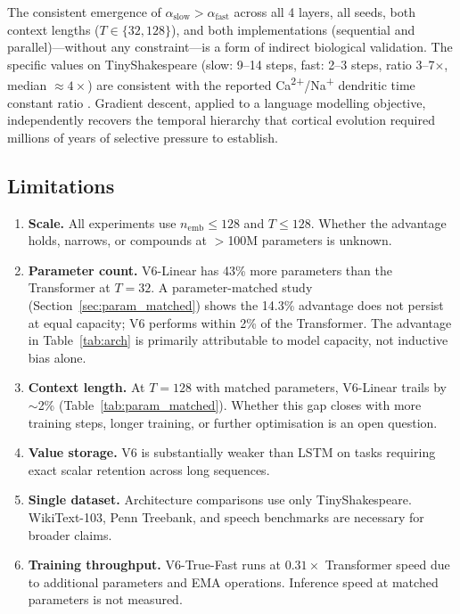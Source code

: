 \documentclass[11pt,a4paper]{article}
\begin{document}
The consistent emergence of $\alpha_\mathrm{slow} > \alpha_\mathrm{fast}$
across all 4 layers, all seeds, both context lengths ($T\in\{32,128\}$),
and both implementations (sequential and parallel)---without any
constraint---is a form of indirect biological validation.
The specific values on TinyShakespeare (slow: 9--14 steps,
fast: 2--3 steps, ratio 3--7$\times$, median $\approx4\times$)
are consistent with the reported
Ca\textsuperscript{2+}/Na\textsuperscript{+} dendritic time constant ratio
\citep{losonczy2006integrative}.
Gradient descent, applied to a language modelling objective,
independently recovers the temporal hierarchy that cortical evolution
required millions of years of selective pressure to establish.

\subsection{Limitations}
\label{sec:limitations}

\begin{enumerate}[leftmargin=*, label=(\arabic*), noitemsep]
\item \textbf{Scale.} All experiments use $n_\mathrm{emb} \leq 128$
  and $T \leq 128$. Whether the advantage holds, narrows, or compounds
  at $>$100M parameters is unknown.

\item \textbf{Parameter count.} V6-Linear has 43\% more parameters than
  the Transformer at $T=32$. A parameter-matched study
  (Section~\ref{sec:param_matched}) shows the 14.3\% advantage does not
  persist at equal capacity; V6 performs within 2\% of the Transformer.
  The advantage in Table~\ref{tab:arch} is primarily attributable to
  model capacity, not inductive bias alone.

\item \textbf{Context length.} At $T=128$ with matched parameters,
  V6-Linear trails by $\sim$2\% (Table~\ref{tab:param_matched}).
  Whether this gap closes with more training steps, longer training,
  or further optimisation is an open question.

\item \textbf{Value storage.} V6 is substantially weaker than LSTM on
  tasks requiring exact scalar retention across long sequences.

\item \textbf{Single dataset.} Architecture comparisons use only
  TinyShakespeare. WikiText-103, Penn Treebank, and speech benchmarks
  are necessary for broader claims.

\item \textbf{Training throughput.} V6-True-Fast runs at
  $0.31\times$ Transformer speed due to additional parameters and EMA
  operations. Inference speed at matched parameters is not measured.
\end{enumerate}
\end{document}
